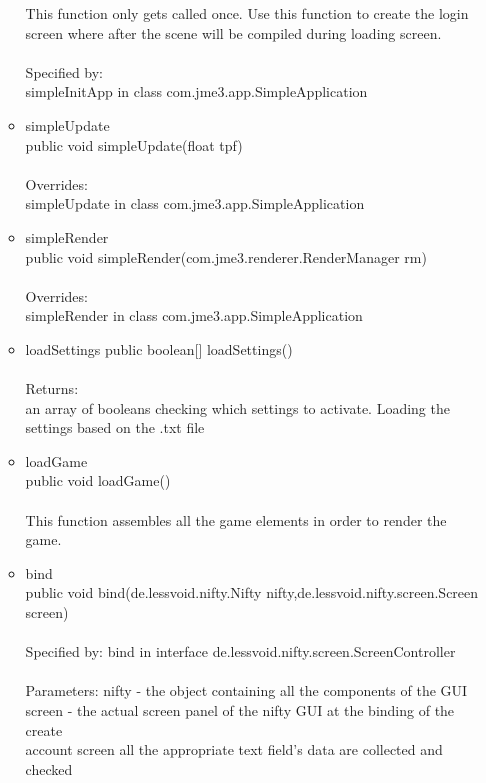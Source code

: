 \documentclass[letterpaper]{article}
\begin{document}
\begin{itemize}
\begin{itemize}
												This function only gets called once. Use this function to create the login screen where after the scene will be compiled during loading screen. \\ \\
												Specified by: \\
												simpleInitApp in class com.jme3.app.SimpleApplication
										\item	simpleUpdate \\
												public void simpleUpdate(float tpf) \\ \\
												Overrides: \\
												simpleUpdate in class com.jme3.app.SimpleApplication
										\item	simpleRender \\
												public void simpleRender(com.jme3.renderer.RenderManager rm) \\ \\
												Overrides: \\
												simpleRender in class com.jme3.app.SimpleApplication
										\item	loadSettings
												public boolean[] loadSettings() \\ \\
												Returns: \\
												an array of booleans checking which settings to activate. Loading the settings based on the .txt file
										\item	loadGame \\
												public void loadGame() \\ \\
												This function assembles all the game elements in order to render the game.
										\item	bind \\
												public void bind(de.lessvoid.nifty.Nifty nifty,de.lessvoid.nifty.screen.Screen screen) \\ \\
												Specified by:
												bind in interface de.lessvoid.nifty.screen.ScreenController \\ \\
												Parameters:
												nifty - the object containing all the components of the GUI \\
												screen - the actual screen panel of the nifty GUI at the binding of the create \\ account screen all the appropriate text field's data are collected and checked

\end{itemize}
\end{itemize}
\end{document}

